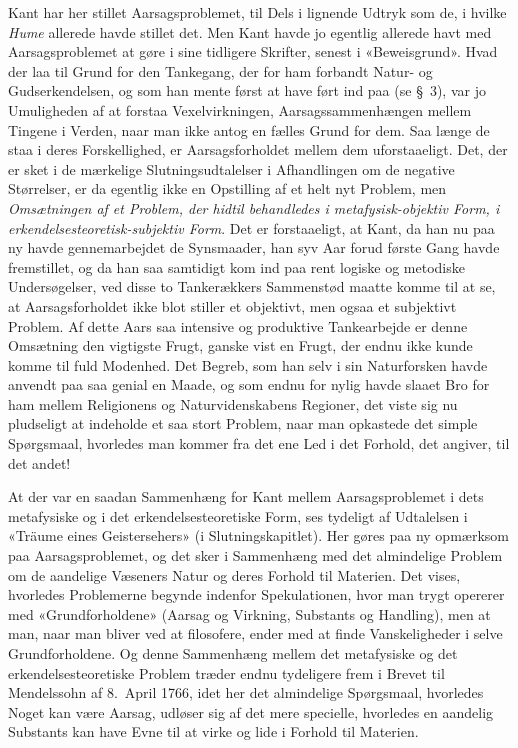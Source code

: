 \documentclass[12pt,a4paper]{article}
\newcommand{\apage}[1]{\marginnote{\footnotesize\textit{[#1]}}}
\begin{document}
Kant har her stillet Aarsagsproblemet, til Dels i lignende Udtryk som de,
i hvilke \emph{Hume} allerede havde stillet det. Men Kant havde jo egentlig
allerede havt med Aarsagsproblemet at gøre i sine tidligere Skrifter,
senest i «Beweisgrund». Hvad der laa til Grund for den Tankegang, der for
ham forbandt Natur- og Gudserkendelsen, og som han mente først at have
ført ind paa (se §\ 3), var jo Umuligheden af at forstaa Vexelvirkningen,
Aarsagssammenhængen mellem Tingene i Verden, naar man ikke antog en
fælles Grund for dem. Saa længe de staa i deres Forskellighed, er
Aarsagsforholdet mellem dem uforstaaeligt. Det, der er sket i de
mærkelige Slutningsudtalelser i Afhandlingen om de negative Størrelser,
er da egentlig ikke en Opstilling af et helt nyt Problem, men
\emph{Omsætningen af et Problem, der hidtil behandledes i metafysisk-objektiv
Form, i erkendelsesteoretisk-subjektiv Form}. Det er forstaaeligt,
at Kant, da han nu paa ny havde gennemarbejdet de Synsmaader, han syv Aar
forud første Gang havde fremstillet, og da han saa samtidigt kom ind paa
rent logiske og metodiske Undersøgelser, ved disse to Tankerækkers
Sammenstød maatte komme til at se, at Aarsagsforholdet ikke blot stiller
et objektivt, men ogsaa et subjektivt Problem. Af dette Aars saa
intensive og produktive Tankearbejde er denne Omsætning den vigtigste
Frugt, ganske vist en Frugt, der endnu ikke kunde komme til fuld
Modenhed. Det Begreb, som han selv i sin Naturforsken havde anvendt paa
saa genial en Maade, og som endnu for nylig havde slaaet Bro for ham
mellem Religionens og Naturvidenskabens Regioner, det viste sig nu
pludseligt at indeholde et saa stort Problem, naar man opkastede det
simple Spørgsmaal, hvorledes man kommer fra det ene Led i det Forhold,
det angiver, til det andet!

At der var en saadan Sammenhæng for Kant mellem Aarsagsproblemet i dets
metafysiske og i det erkendelsesteoretiske Form, ses tydeligt af
Udtalelsen i «Träume eines \apage{21} Geistersehers» (i Slutningskapitlet). Her
gøres paa ny opmærksom paa Aarsagsproblemet, og det sker i Sammenhæng med
det almindelige Problem om de aandelige Væseners Natur og deres Forhold
til Materien. Det vises, hvorledes Problemerne begynde indenfor
Spekulationen, hvor man trygt opererer med «Grundforholdene» (Aarsag og
Virkning, Substants og Handling), men at man, naar man bliver ved at
filosofere, ender med at finde Vanskeligheder i selve Grundforholdene. Og
denne Sammenhæng mellem det metafysiske og det erkendelsesteoretiske
Problem træder endnu tydeligere frem i Brevet til Mendelssohn af 8.\
April 1766, idet her det almindelige Spørgsmaal, hvorledes Noget kan være
Aarsag, udløser sig af det mere specielle, hvorledes en aandelig
Substants kan have Evne til at virke og lide i Forhold til Materien.
\end{document}

